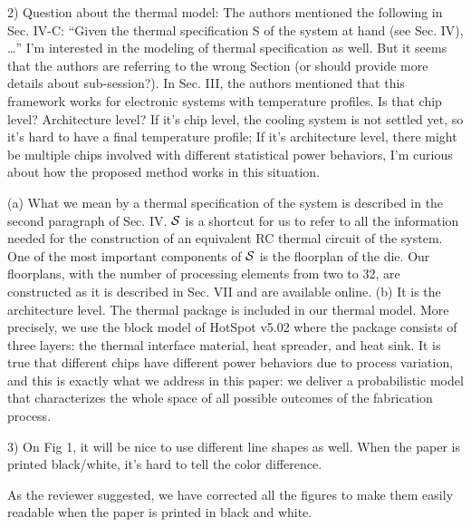 \begin{reviewer}
2) Question about the thermal model: The authors mentioned the following in Sec. IV-C: “Given the thermal specification S of the system at hand (see Sec. IV), …” I’m interested in the modeling of thermal specification as well. But it seems that the authors are referring to the wrong Section (or should provide more details about sub-session?). In Sec. III, the authors mentioned that this framework works for electronic systems with temperature profiles. Is that chip level? Architecture level? If it’s chip level, the cooling system is not settled yet, so it’s hard to have a final temperature profile; If it’s architecture level, there might be multiple chips involved with different statistical power behaviors, I’m curious about how the proposed method works in this situation.
\end{reviewer}
\begin{authors}
(a) What we mean by a thermal specification of the system is described in the second paragraph of Sec. IV.
$\mathcal{S}$ is a shortcut for us to refer to all the information needed for the construction of an equivalent RC thermal circuit of the system.
One of the most important components of $\mathcal{S}$ is the floorplan of the die.
Our floorplans, with the number of processing elements from two to 32, are constructed as it is described in Sec. VII and are available online.
(b) It is the architecture level.
The thermal package is included in our thermal model.
More precisely, we use the block model of HotSpot v5.02 where the package consists of three layers: the thermal interface material, heat spreader, and heat sink.
It is true that different chips have different power behaviors due to process variation, and this is exactly what we address in this paper: we deliver a probabilistic model that characterizes the whole space of all possible outcomes of the fabrication process.
\end{authors}

\begin{reviewer}
3) On Fig 1, it will be nice to use different line shapes as well. When the paper is printed black/white, it’s hard to tell the color difference.
\end{reviewer}
\begin{authors}
As the reviewer suggested, we have corrected all the figures to make them easily readable when the paper is printed in black and white.
\end{authors}
